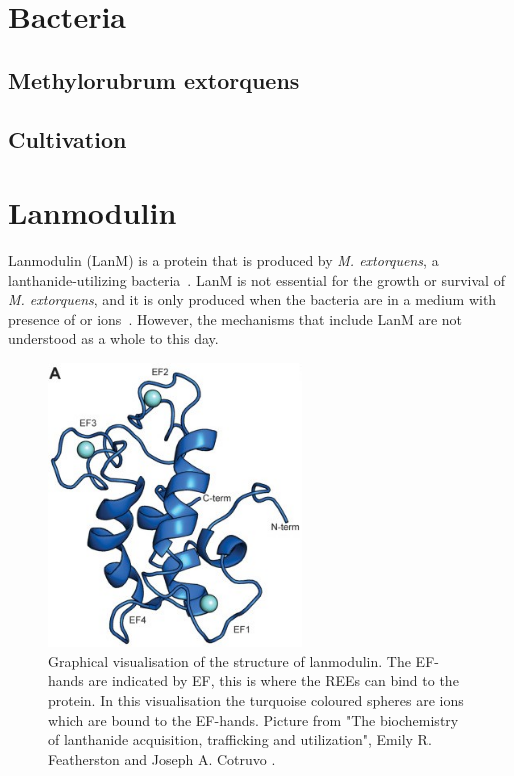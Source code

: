 \section{Bacteria\authorB{}}


\subsection{Methylorubrum extorquens}

\subsection{Cultivation}

\section{Lanmodulin\authorA}

Lanmodulin (LanM) is a protein that is produced by \textit{M. extorquens}, a lanthanide-utilizing bacteria~\cite{lanmdiscovery}.
LanM is not essential for the growth or survival of \textit{M. extorquens}, and it is only produced when the bacteria are in a medium with presence of  or  ions~\cite{lanmroleinbiology}.
However, the mechanisms that include LanM are not understood as a whole to this day.

\begin{figure}[H]
    \centering
    \includegraphics[width=0.6\textwidth]{./media/images/lanm_structure}
    \caption{Graphical visualisation of the structure of lanmodulin. The EF-hands are indicated by EF, this is where the REEs can bind to the protein. In this visualisation the turquoise coloured spheres are  ions which are bound to the EF-hands. Picture from "The biochemistry of lanthanide acquisition, trafficking and utilization", Emily R. Featherston and Joseph A. Cotruvo \cite{lanmroleinbiology}.}
    \label{fig:lanm_structure}
\end{figure}

